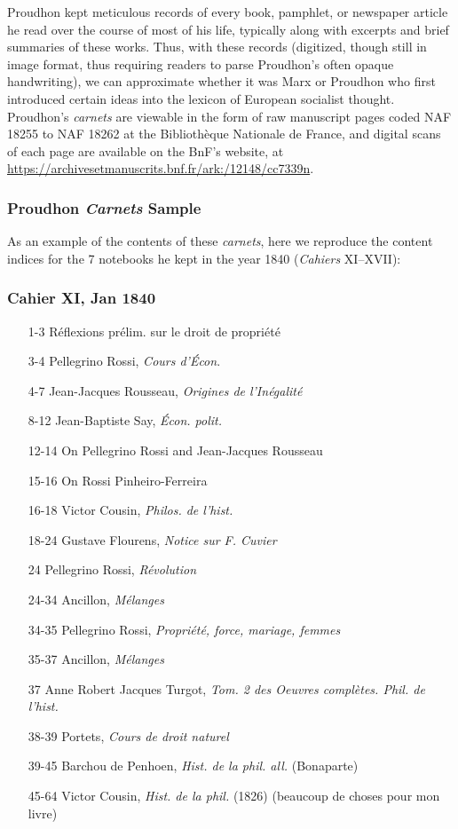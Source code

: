 Proudhon kept meticulous records of every book, pamphlet, or newspaper article he read over the course of most of his life, typically along with excerpts and brief summaries of these works. Thus, with these records (digitized, though still in image format, thus requiring readers to parse Proudhon's often opaque handwriting), we can approximate whether it was Marx or Proudhon who first introduced certain ideas into the lexicon of European socialist thought. Proudhon's \textit{carnets} are viewable in the form of raw
manuscript pages coded NAF 18255 to NAF 18262 at the Bibliothèque Nationale de France, and digital scans of
each page are available on the BnF’s website, at \href{https://archivesetmanuscrits.bnf.fr/ark:/12148/cc7339n}{https://archivesetmanuscrits.bnf.fr/ark:/12148/cc7339n}.

\subsubsection*{Proudhon \textit{Carnets} Sample}

As an example of the contents of these \textit{carnets}, here we reproduce the content indices for the 7 notebooks he kept in the year 1840 (\textit{Cahiers} XI--XVII):

\subsubsection*{Cahier XI, Jan 1840}
\begin{enumerate}
    \item[1-3] Réflexions prélim. sur le droit de propriété
    \item[3-4] Pellegrino Rossi, \textit{Cours d'Écon}.
	\item[4-7] Jean-Jacques Rousseau, \textit{Origines de l'Inégalité}
	\item[8-12] Jean-Baptiste Say, \textit{Écon. polit.}
	\item[12-14] On Pellegrino Rossi and Jean-Jacques Rousseau
	\item[15-16] On Rossi Pinheiro-Ferreira	
	\item[16-18] Victor Cousin, \textit{Philos. de l'hist.}
	\item[18-24] Gustave Flourens, \textit{Notice sur F. Cuvier}
    \item[24] Pellegrino Rossi, \textit{Révolution}
    \item[24-34] Ancillon, \textit{Mélanges}
    \item[34-35] Pellegrino Rossi, \textit{Propriété, force, mariage, femmes}
	\item[35-37] Ancillon, \textit{Mélanges}	
	\item[37] Anne Robert Jacques Turgot, \textit{Tom. 2 des Oeuvres complètes. Phil. de l'hist.}
    \item[38-39] Portets, \textit{Cours de droit naturel}
	\item[39-45] Barchou de Penhoen, \textit{Hist. de la phil. all.} (Bonaparte)
    \item[45-64] Victor Cousin, \textit{Hist. de la phil.} (1826) (beaucoup de choses pour mon livre)
\end{enumerate}

